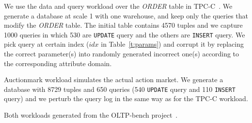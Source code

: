 { \color{blue}
 We use the data and query workload over the {\it
ORDER} table in TPC-C~\cite{}.  We generate a database at scale
1 with one warehouse, and keep only the queries that modify the
{\it ORDER} table. The initial table contains 4570 tuples and we capture 
1000 queries in which 530 are \texttt{UPDATE} query and the others
are \texttt{INSERT} query. 
We pick query at certain index ($idx$ in Table~\ref{t:params}) 
and corrupt it by replacing the correct parameter(s) into randomly 
generated incorrect one(s) according to the corresponding attribute domain. 

 Auctionmark workload simulates the 
actual action market. We generate a database 
with 8729 tuples and 650 queries (540 \texttt{UPDATE} query and 110 \texttt{INSERT} query) 
and we perturb the query log in the same way as for the TPC-C workload.

Both workloads generated from the OLTP-bench project~\cite{oltpbench,oltpbenchgit}.



}
